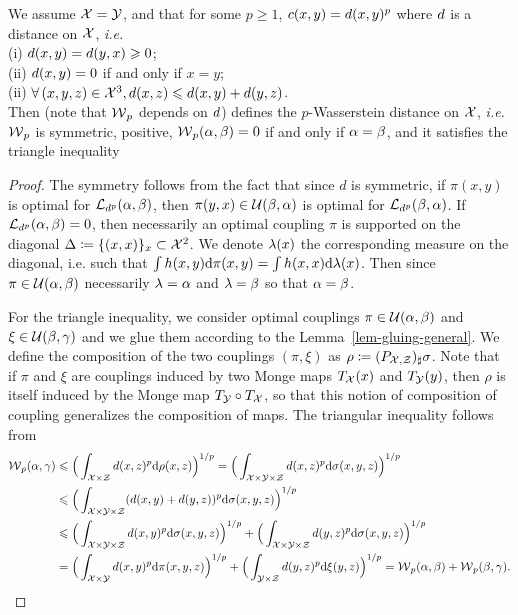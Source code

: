 \begin{prop}\label{prop-metric-measure}
We assume $\mathcal{X}=\mathcal{Y}$, and that for some $p \geq 1$, $c(x,y)=d(x,y)^p$ where $d$ is a distance on $\mathcal{X}$, \emph{i.e.} \\
	\hbox{}\qquad (i) $d(x,y) = d(y,x) \geqslant 0$;  \\
	\hbox{}\qquad (ii)  $d(x,y)=0$ if and only if $x=y$;  \\
	\hbox{}\qquad (ii)  $\forall \, (x,y,z) \in \mathcal{X}^3, d(x,z) \leqslant d(x,y)+d(y,z)$. \\
Then 
(note that $\operatorname{\mathcal{W}}_p$ depends on $d$) defines the $p$-Wasserstein distance on $\mathcal{X}$, \emph{i.e.} $\operatorname{\mathcal{W}}_p$ is symmetric, positive, $\operatorname{\mathcal{W}}_p(\alpha,\beta)=0$ if and only if $\alpha = \beta$, and it satisfies the triangle inequality
\end{prop}

\begin{proof}
	The symmetry follows from the fact that since $d$ is symmetric, if $\pi(x,y)$ is optimal for $\mathcal{L}_{d^p}(\alpha,\beta)$, then 
	$\pi(y,x) \in \mathcal{U}(\beta,\alpha)$ is optimal for $\mathcal{L}_{d^p}(\beta,\alpha)$. 
	If $\mathcal{L}_{d^p}(\alpha,\beta)=0$, then necessarily an optimal coupling $\pi$ is supported on the diagonal $\Delta \coloneqq \{(x,x)\}_x \subset \mathcal{X}^2$.
	We denote $\lambda(x)$ the corresponding measure on the diagonal, i.e. such that $\int h(x,y) \mathrm{d}\pi(x,y) = \int h(x,x) \mathrm{d} \lambda(x)$.
	Then since $\pi \in \mathcal{U}(\alpha,\beta)$ necessarily $\lambda=\alpha$ and $\lambda=\beta$ so that $\alpha=\beta$.
	
	For the triangle inequality, we consider optimal couplings $\pi \in \mathcal{U}(\alpha,\beta)$ and $\xi \in \mathcal{U}(\beta,\gamma)$
	and we glue them according to the Lemma~\ref{lem-gluing-general}.
	We define the composition of the two couplings $(\pi,\xi)$ as $\rho \coloneqq (P_{\mathcal{X},\mathcal{Z}})_\sharp \sigma$.
	Note that if $\pi$ and $\xi$ are couplings induced by two Monge maps $T_{\mathcal{X}}(x)$ and $T_{\mathcal{Y}}(y)$, then $\rho$ is itself induced by the Monge map $T_{\mathcal{Y}} \circ T_{\mathcal{X}}$, so that this notion of composition of coupling generalizes the composition of maps.
	The triangular inequality follows from  
	$$\begin{aligned}
		\operatorname{\mathcal{W}}_p(\alpha,\gamma) & \leqslant \Big( \int_{\mathcal{X} \times \mathcal{Z}} d(x,z)^p \mathrm{d}\rho(x,z)\Big)^{1/p}  
		= \Big( \int_{\mathcal{X} \times \mathcal{Y} \times \mathcal{Z}} d(x,z)^p \mathrm{d}\sigma(x,y,z)\Big)^{1/p}		\\
		 &\leqslant \Big( \int_{\mathcal{X} \times \mathcal{Y} \times \mathcal{Z}} (d(x,y)+d(y,z))^p \mathrm{d}\sigma(x,y,z)\Big)^{1/p} \\
		 &\leqslant \Big( \int_{\mathcal{X} \times \mathcal{Y} \times \mathcal{Z}} d(x,y)^p \mathrm{d}\sigma(x,y,z)\Big)^{1/p}
		    +  \Big( \int_{\mathcal{X} \times \mathcal{Y} \times \mathcal{Z}} d(y,z)^p \mathrm{d}\sigma(x,y,z)\Big)^{1/p} \\
		  &= \Big( \int_{\mathcal{X} \times \mathcal{Y}} d(x,y)^p \mathrm{d}\pi(x,y,z)\Big)^{1/p}
		    +  \Big( \int_{\mathcal{Y} \times \mathcal{Z}} d(y,z)^p \mathrm{d}\xi(y,z)\Big)^{1/p}
		    = \operatorname{\mathcal{W}}_p(\alpha,\beta)  + \operatorname{\mathcal{W}}_p(\beta,\gamma) .
	\end{aligned}$$
\end{proof}

